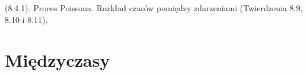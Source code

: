 {
\makeatletter
{}
\makeatother
\graphicspath{{../probabil}}

\begin{questiontext}
	(8.4.1). Proces Poissona. Rozkład czasów pomiędzy zdarzeniami (Twierdzenia 8.9, 8.10 i 8.11).
\end{questiontext}

\section{Międzyczasy}

}
